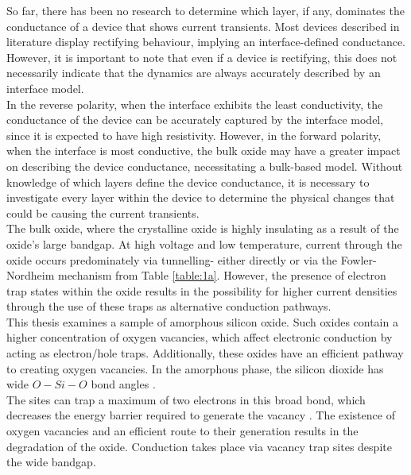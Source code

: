 \noindent So far, there has been no research to determine which layer, if any, dominates the conductance of a device that shows current transients. Most devices described in literature display rectifying behaviour, implying an interface-defined conductance. However, it is important to note that even if a device is rectifying, this does not necessarily indicate that the dynamics are always accurately described by an interface model. \\

\noindent In the reverse polarity, when the interface exhibits the least conductivity, the conductance of the device can be accurately captured by the interface model, since it is expected to have high resistivity. However, in the forward polarity, when the interface is most conductive, the bulk oxide may have a greater impact on describing the device conductance, necessitating a bulk-based model. Without knowledge of which layers define the device conductance, it is necessary to investigate every layer within the device to determine the physical changes that could be causing the current transients. \\

\noindent The bulk oxide, where the crystalline oxide is highly insulating as a result of the oxide's large bandgap. At high voltage and low temperature, current through the oxide occurs predominately via tunnelling- either directly or via the Fowler-Nordheim mechanism from Table \ref{table:1a}. However, the presence of electron trap states within the oxide results in the possibility for higher current densities through the use of these traps as alternative conduction pathways. \\

\noindent This thesis examines a sample of amorphous silicon oxide. Such oxides contain a higher concentration of oxygen vacancies, which affect electronic conduction by acting as electron/hole traps. Additionally, these oxides have an efficient pathway to creating oxygen vacancies. In the amorphous phase, the silicon dioxide has wide $O-Si-O$ bond angles \cite{el2013identification}.\\

\noindent The sites can trap a maximum of two electrons in this broad bond, which decreases the energy barrier required to generate the vacancy \cite{gao2016mechanism}. The existence of oxygen vacancies and an efficient route to their generation results in the degradation of the oxide. Conduction takes place via vacancy trap sites despite the wide bandgap. \\

